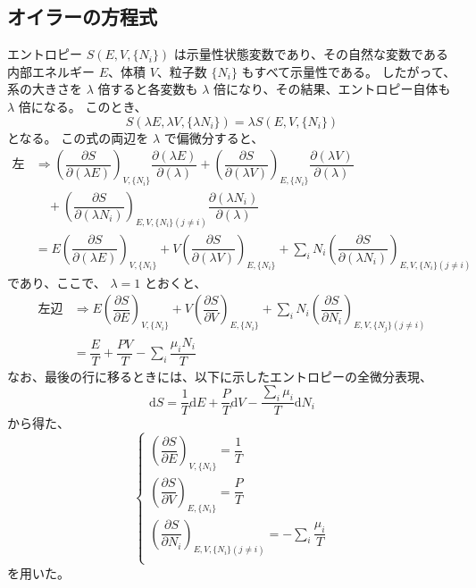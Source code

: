 \documentclass[uplatex,dvipdfmx,a4paper,11pt]{jsarticle}
\newcommand{\diff}{\mathrm d}
\newcommand{\difp}[2]{\dfrac{\partial #1}{\partial #2}}
\begin{document}
\subsection{オイラーの方程式}
エントロピー $S(E, V, \{N_i \})$ は示量性状態変数であり、その自然な変数である内部エネルギー $E$、体積 $V$、粒子数 $\{N_i \}$ もすべて示量性である。
したがって、系の大きさを $\lambda$ 倍すると各変数も $\lambda$ 倍になり、その結果、エントロピー自体も $\lambda$ 倍になる。
このとき、
\begin{equation*}
S(\lambda E, \lambda V, \{\lambda N_i \} ) = \lambda S(E, V, \{N_i \})
\end{equation*}
となる。
この式の両辺を $\lambda$ で偏微分すると、
\begin{align*}
	\text{左辺} 
		&\Rightarrow 
			\left(\difp{S}{(\lambda E)} \right)_{V, \{ N_i \} } \difp{(\lambda E)}{(\lambda)} 
			+ \left(\difp{S}{(\lambda V)} \right)_{E, \{ N_i \} } \difp{(\lambda V)}{(\lambda)} 
			\\
		&\quad
			+ \left(\difp{S}{(\lambda N_i)} \right)_{E, V, \{ N_i \}(j \neq i) } \difp{(\lambda N_i)}{(\lambda)}
			\\
		&= 
			E \left(\difp{S}{(\lambda E)} \right)_{V, \{ N_i \} }  
			+ V \left(\difp{S}{(\lambda V)} \right)_{E, \{ N_i \} }
			+ \sum_i N_i \left(\difp{S}{(\lambda N_i)} \right)_{E, V, \{ N_i \}(j \neq i) }
\end{align*}
であり、ここで、 $\lambda = 1$ とおくと、
\begin{align*}
	\text{左辺} 
		&\Rightarrow 
			E \left(\difp{S}{E} \right)_{V, \{ N_i \} }  
			+ V \left(\difp{S}{V} \right)_{E, \{ N_i \} }
			+ \sum_i N_i \left(\difp{S}{N_i} \right)_{E, V, \{ N_j \}(j \neq i) }
		\\
		&=
			\dfrac{E}{T} + \dfrac{PV}{T} - \sum_i \dfrac{ \mu_i N_i}{T}
\end{align*}
なお、最後の行に移るときには、以下に示したエントロピーの全微分表現、
\begin{equation*}
\diff S = \dfrac{1}{T} \diff E + \dfrac{P}{T} \diff V - \dfrac{\sum_i \mu_i}{T} \diff N_i
\end{equation*}
から得た、
\begin{equation*}
\begin{cases}
	\left(\difp{S}{E} \right)_{V, \{ N_i \} } = \dfrac{1}{T} \\[10pt]
	\left(\difp{S}{V} \right)_{E, \{ N_i \} } = \dfrac{P}{T} \\[10pt]
	\left(\difp{S}{N_i} \right)_{E, V, \{ N_i \}(j \neq i) } = - \sum_i \dfrac{\mu_i}{T} \\ 
\end{cases}
\end{equation*}
を用いた。
\end{document}
